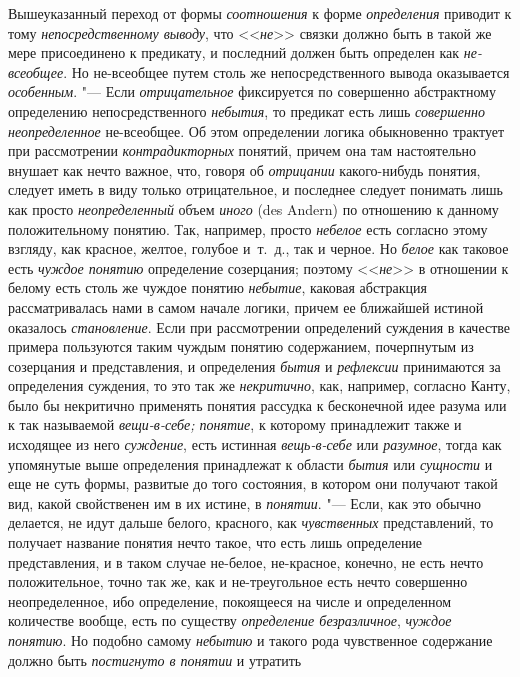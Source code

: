 Вышеуказанный переход от формы {\em соотношения} к форме {\em определения}
приводит к тому {\em непосредственному выводу}, что <<{\em не}>> связки должно
быть в такой же мере присоединено к предикату, и последний должен быть
определен как {\em не-всеобщее}. Но не-всеобщее путем столь же
непосредственного вывода оказывается {\em особенным}. "--- Если
{\em отрицательное} фиксируется по совершенно абстрактному определению
непосредственного {\em небытия}, то предикат есть лишь {\em совершенно
неопределенное} не-всеобщее. Об этом определении логика обыкновенно трактует
при рассмотрении {\em контрадикторных} понятий, причем она там настоятельно
внушает как нечто важное, что, говоря об {\em отрицании} какого-нибудь понятия,
следует иметь в виду только отрицательное, и последнее следует понимать лишь
как просто {\em неопределенный} объем {\em иного} (des Andern) по отношению к
данному положительному понятию. Так, например, просто {\em небелое} есть
согласно этому взгляду, как красное, желтое, голубое и~т.~д., так и черное.
Но {\em белое} как таковое есть {\em чуждое понятию} определение созерцания;
поэтому <<{\em не}>> в отношении к белому есть столь же чуждое понятию
{\em небытие}, каковая абстракция рассматривалась нами в самом начале логики,
причем ее ближайшей истиной оказалось {\em становление}. Если при рассмотрении
определений суждения в качестве примера пользуются таким чуждым понятию
содержанием, почерпнутым из созерцания и представления, и определения
{\em бытия} и {\em рефлексии} принимаются за определения суждения, то это так
же {\em некритично}, как, например, согласно Канту, было бы некритично
применять понятия рассудка к бесконечной идее разума или к так называемой
{\em вещи-в-себе; понятие}, к которому принадлежит также и исходящее из него
{\em суждение}, есть истинная {\em вещь-в-себе} или {\em разумное}, тогда как
упомянутые выше определения принадлежат к области {\em бытия} или
{\em сущности} и еще не суть формы, развитые до того состояния, в котором они
получают такой вид, какой свойственен им в их истине, в {\em понятии}. "---
Если, как это обычно делается, не идут дальше белого, красного, как
{\em чувственных} представлений, то получает название понятия нечто такое, что
есть лишь определение представления, и в таком случае не-белое, не-красное,
конечно, не есть нечто положительное, точно так же, как и не-треугольное есть
нечто совершенно неопределенное, ибо определение, покоящееся на числе и
определенном количестве вообще, есть по существу {\em определение
безразличное}, {\em чуждое понятию}. Но подобно самому {\em небытию} и такого
рода чувственное содержание должно быть {\em постигнуто в понятии} и утратить
